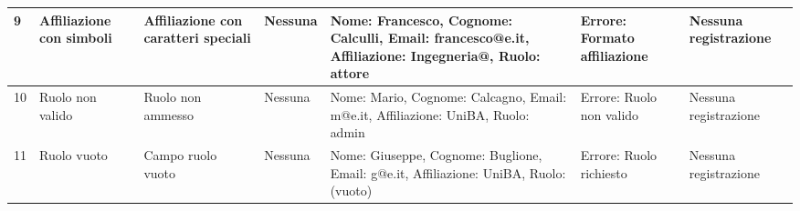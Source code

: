 \begin{tabular}{|p{2cm}|p{2cm}|p{2cm}|p{2cm}|p{4cm}|p{3cm}|p{2cm}|}
\hline
9 & Affiliazione con simboli & Affiliazione con caratteri speciali & Nessuna & Nome: Francesco, Cognome: Calculli, Email: francesco@e.it, Affiliazione: Ingegneria@, Ruolo: attore & Errore: Formato affiliazione & Nessuna registrazione \\
\hline
10 & Ruolo non valido & Ruolo non ammesso & Nessuna & Nome: Mario, Cognome: Calcagno, Email: m@e.it, Affiliazione: UniBA, Ruolo: admin & Errore: Ruolo non valido & Nessuna registrazione \\
\hline
11 & Ruolo vuoto & Campo ruolo vuoto & Nessuna & Nome: Giuseppe, Cognome: Buglione, Email: g@e.it, Affiliazione: UniBA, Ruolo: (vuoto) & Errore: Ruolo richiesto & Nessuna registrazione \\
\hline
\end{tabular}

